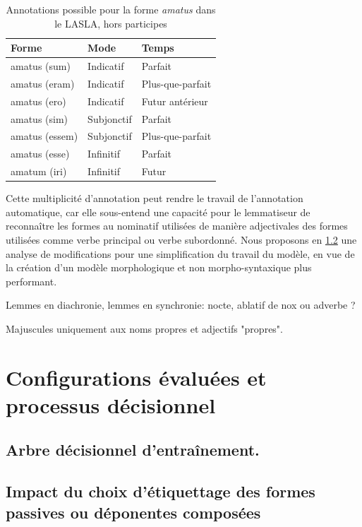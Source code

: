 
\newpara

\begin{table}[h]
\centering
\begin{tabular}{@{}lll@{}}
\toprule
Forme & Mode & Temps \\ \midrule
amatus (sum) & Indicatif & Parfait \\
amatus (eram) & Indicatif & Plus-que-parfait \\
amatus (ero) & Indicatif & Futur antérieur \\
amatus (sim) & Subjonctif & Parfait \\
amatus (essem) & Subjonctif & Plus-que-parfait \\
amatus (esse) & Infinitif & Parfait \\
amatum (iri) & Infinitif & Futur \\ \bottomrule
\end{tabular}
\caption{Annotations possible pour la forme \textit{amatus} dans le LASLA, hors participes}
\label{table:amatus_forms}
\end{table}

Cette multiplicité d'annotation peut rendre le travail de l'annotation automatique, car elle sous-entend une capacité pour le lemmatiseur de reconnaître les formes au nominatif utilisées de manière adjectivales des formes utilisées comme verbe principal ou verbe subordonné. Nous proposons en \ref{subsec:training:lasla-modification} une analyse de modifications pour une simplification du travail du modèle, en vue de la création d'un modèle morphologique et non morpho-syntaxique plus performant.

\newpara

Lemmes en diachronie, lemmes en synchronie: nocte, ablatif de nox ou adverbe ?

Majuscules uniquement aux noms propres et adjectifs "propres".

\section{Configurations évaluées et processus décisionnel}

\subsection{Arbre décisionnel d'entraînement.}




\subsection{Impact du choix d'étiquettage des formes passives ou déponentes composées}
\label{subsec:training:lasla-modification}

